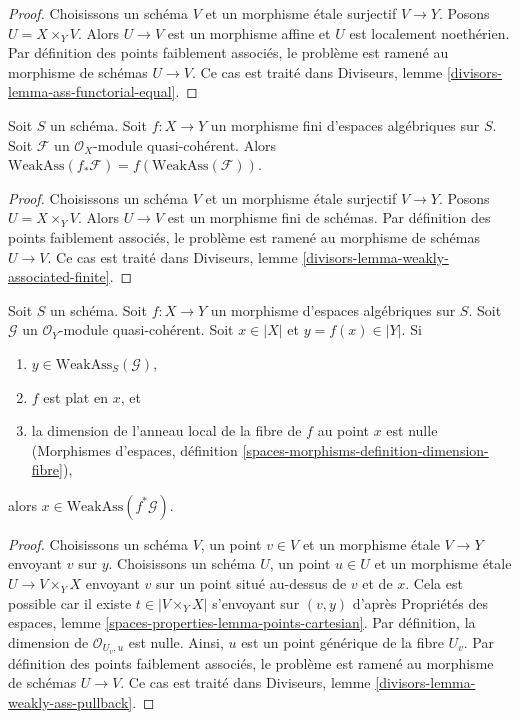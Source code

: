 \begin{proof}
Choisissons un schéma $V$ et un morphisme \'etale surjectif $V \to Y$.
Posons $U = X \times_Y V$. Alors $U \to V$ est un morphisme affine
et $U$ est localement noethérien.
Par définition des points faiblement associés,
le problème est ramené au morphisme de schémas $U \to V$. Ce cas est
traité dans Diviseurs, lemme \ref{divisors-lemma-ass-functorial-equal}.
\end{proof}

\begin{lemma}
\label{lemma-weakly-associated-finite}
Soit $S$ un schéma.
Soit $f : X \to Y$ un morphisme fini d'espaces algébriques sur $S$.
Soit $\mathcal{F}$ un $\mathcal{O}_X$-module quasi-cohérent.
Alors $\text{WeakAss}(f_*\mathcal{F}) = f(\text{WeakAss}(\mathcal{F}))$.
\end{lemma}

\begin{proof}
Choisissons un schéma $V$ et un morphisme \'etale surjectif $V \to Y$.
Posons $U = X \times_Y V$. Alors $U \to V$ est un morphisme fini
de schémas. Par définition des points faiblement associés,
le problème est ramené au morphisme de schémas $U \to V$. Ce cas est
traité dans Diviseurs, lemme \ref{divisors-lemma-weakly-associated-finite}.
\end{proof}

\begin{lemma}
\label{lemma-weakly-ass-pullback}
Soit $S$ un schéma. Soit $f : X \to Y$ un morphisme d'espaces algébriques
sur $S$. Soit $\mathcal{G}$ un $\mathcal{O}_Y$-module quasi-cohérent.
Soit $x \in |X|$ et $y = f(x) \in |Y|$. Si
\begin{enumerate}
\item $y \in \text{WeakAss}_S(\mathcal{G})$,
\item $f$ est plat en $x$, et
\item la dimension de l'anneau local de la fibre de $f$ au point $x$
est nulle (Morphismes d'espaces, définition
\ref{spaces-morphisms-definition-dimension-fibre}),
\end{enumerate}
alors $x \in \text{WeakAss}(f^*\mathcal{G})$.
\end{lemma}

\begin{proof}
Choisissons un schéma $V$, un point $v \in V$ et un morphisme \'etale $V \to Y$
envoyant $v$ sur $y$. Choisissons un schéma $U$, un point $u \in U$ et un
morphisme \'etale $U \to V \times_Y X$ envoyant $v$ sur un point situé au-dessus de
$v$ et de $x$. Cela est possible car il existe $t \in |V \times_Y X|$
s'envoyant sur $(v, y)$ d'après Propriétés des espaces, lemme
\ref{spaces-properties-lemma-points-cartesian}.
Par définition, la dimension de $\mathcal{O}_{U_v, u}$ est nulle.
Ainsi, $u$ est un point générique de la fibre $U_v$.
Par définition des points faiblement associés,
le problème est ramené au morphisme de schémas $U \to V$.
Ce cas est traité dans
Diviseurs, lemme \ref{divisors-lemma-weakly-ass-pullback}.
\end{proof}

